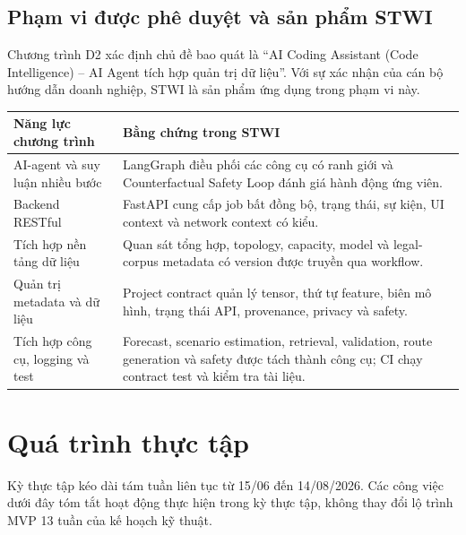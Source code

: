 \documentclass[12pt,a4paper]{report}
\begin{document}
\section{Phạm vi được phê duyệt và sản phẩm STWI}
Chương trình D2 xác định chủ đề bao quát là ``AI Coding Assistant (Code Intelligence) -- AI Agent tích hợp quản trị dữ liệu''. Với sự xác nhận của cán bộ hướng dẫn doanh nghiệp, STWI là sản phẩm ứng dụng trong phạm vi này.

\begin{longtable}{L{4.8cm}L{8.2cm}}
\toprule
\textbf{Năng lực chương trình} & \textbf{Bằng chứng trong STWI}\\
\midrule
AI-agent và suy luận nhiều bước & LangGraph điều phối các công cụ có ranh giới và Counterfactual Safety Loop đánh giá hành động ứng viên.\\
Backend RESTful & FastAPI cung cấp job bất đồng bộ, trạng thái, sự kiện, UI context và network context có kiểu.\\
Tích hợp nền tảng dữ liệu & Quan sát tổng hợp, topology, capacity, model và legal-corpus metadata có version được truyền qua workflow.\\
Quản trị metadata và dữ liệu & Project contract quản lý tensor, thứ tự feature, biên mô hình, trạng thái API, provenance, privacy và safety.\\
Tích hợp công cụ, logging và test & Forecast, scenario estimation, retrieval, validation, route generation và safety được tách thành công cụ; CI chạy contract test và kiểm tra tài liệu.\\
\bottomrule
\end{longtable}

\chapter{Quá trình thực tập}
Kỳ thực tập kéo dài tám tuần liên tục từ 15/06 đến 14/08/2026. Các công việc dưới đây tóm tắt hoạt động thực hiện trong kỳ thực tập, không thay đổi lộ trình MVP 13 tuần của kế hoạch kỹ thuật.
\end{document}

